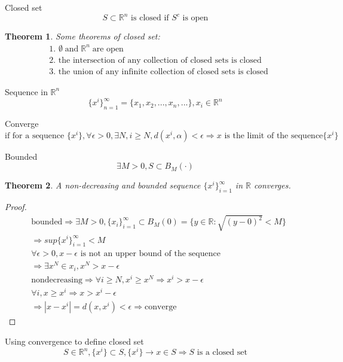 \documentclass{article}
\newtheorem{theorem}{Theorem}
\begin{document}
Closed set
$$S\subset \mathbb{R}^{n} \text{ is closed if }S^{c}\text{ is open}$$

\begin{theorem}
Some theorems of closed set:
\begin{align}
&\text{1. } \emptyset \; \text{and} \; \mathbb{R}^{n}\; \text{are open}
\\&\text{2. the intersection of any collection of closed sets is closed} 
\\&\text{3. the union of any infinite collection of closed sets is closed}
\end{align}
\end{theorem}

Sequence in $\mathbb{R}^{n}$
$$\{x^{i}\}_{n=1}^{\infty}=\{x_{1},x_{2},...,x_{n},...\},x_{i}\in \mathbb{R}^{n}$$

Converge
$$\text{if for a sequence }\{x^{i}\},\forall \epsilon>0,\exists N,i \geqslant N,d(x^{i},\alpha)<\epsilon \Rightarrow x\text{ is the limit of the sequence}\{x^{i}\}$$

Bounded
$$\exists M>0,S \subset B_{M}(\cdot)$$

\begin{theorem}
A non-decreasing and bounded sequence $\{x^{i}\}_{i=1}^{\infty}$ in $\mathbb{R}$ converges.
\end{theorem}

\begin{proof}
\begin{align}
&\text{bounded} \Rightarrow \exists M >0,\{x_{i}\}_{i=1}^{\infty} \subset B_{M}(0)=\{y\in \mathbb{R}: \sqrt{(y-0)^{2}}<M \}
\\&\Rightarrow sup\{x^{i}\}_{i=1}^{\infty} <M
\\&\forall \epsilon >0,x-\epsilon \text{ is not an upper bound of the sequence}
\\&\Rightarrow \exists x^{N}\in {x_{i}},x^{N} > x-\epsilon 
\\&\text{nondecreasing} \Rightarrow \forall i \geqslant N,x^{i} \geqslant x^{N} \Rightarrow x^{i}>x-\epsilon
\\&\forall i, x \geqslant x^{i} \Rightarrow x > x^{i}- \epsilon
\\& \Rightarrow |x-x^{i}|=d(x,x^{i})< \epsilon \Rightarrow \text{converge}
\end{align}
\end{proof}

Using convergence to define closed set
$$S\in \mathbb{R}^{n},\{x^{i}\}\subset S,\{x^{i}\} \to x \in S \Rightarrow S \text{ is a closed set}$$
\end{document}

